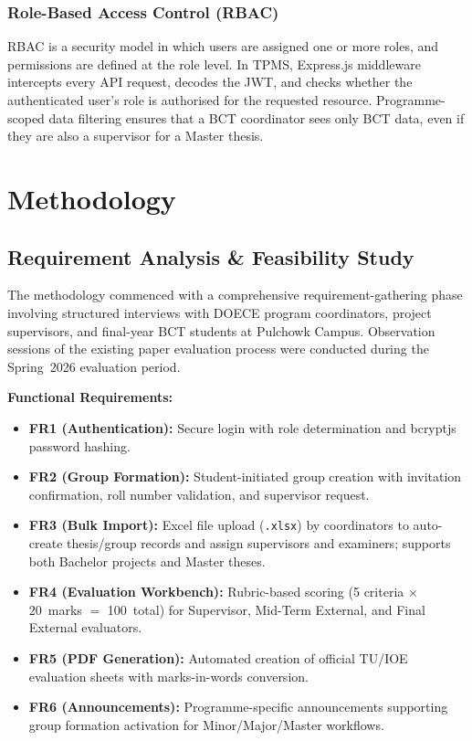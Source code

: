 \documentclass[12pt]{report}
\begin{document}
\subsection{Role-Based Access Control (RBAC)}
RBAC is a security model in which users are assigned one or more roles, and permissions
are defined at the role level. In TPMS, Express.js middleware intercepts every API
request, decodes the JWT, and checks whether the authenticated user's role is
authorised for the requested resource. Programme-scoped data filtering ensures that a
BCT coordinator sees only BCT data, even if they are also a supervisor for a Master
thesis.

\chapter{Methodology}

\section{Requirement Analysis \& Feasibility Study}
The methodology commenced with a comprehensive requirement-gathering phase involving
structured interviews with DOECE program coordinators, project supervisors, and
final-year BCT students at Pulchowk Campus. Observation sessions of the existing paper
evaluation process were conducted during the Spring~2026 evaluation period.

\textbf{Functional Requirements:}
\begin{itemize}[leftmargin=1.5cm]
    \item \textbf{FR1 (Authentication):} Secure login with role determination and
          bcryptjs password hashing.
    \item \textbf{FR2 (Group Formation):} Student-initiated group creation with
          invitation confirmation, roll number validation, and supervisor request.
    \item \textbf{FR3 (Bulk Import):} Excel file upload (\texttt{.xlsx}) by
          coordinators to auto-create thesis/group records and assign supervisors and
          examiners; supports both Bachelor projects and Master theses.
    \item \textbf{FR4 (Evaluation Workbench):} Rubric-based scoring
          (5 criteria $\times$ 20~marks $=$ 100~total) for Supervisor, Mid-Term
          External, and Final External evaluators.
    \item \textbf{FR5 (PDF Generation):} Automated creation of official TU/IOE
          evaluation sheets with marks-in-words conversion.
    \item \textbf{FR6 (Announcements):} Programme-specific announcements supporting
          group formation activation for Minor/Major/Master workflows.
\end{itemize}
\end{document}
